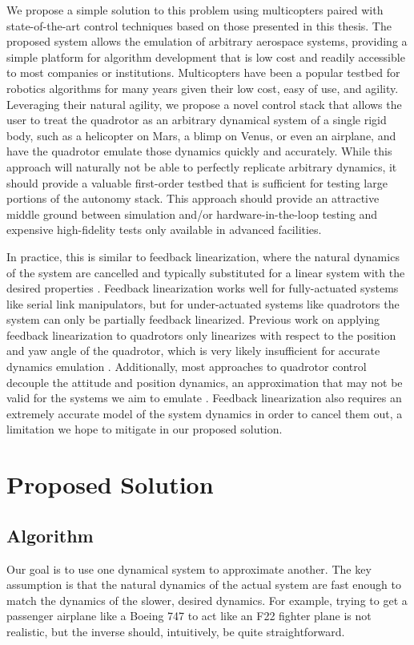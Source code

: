 \documentclass[../root.tex]{subfiles}
\begin{document}
We propose a simple solution to this problem using multicopters paired with
state-of-the-art control techniques based on those presented in this thesis.
The proposed system allows the emulation of arbitrary aerospace systems,
providing a simple platform for algorithm development that is low cost and
readily accessible to most companies or institutions. Multicopters have been
a popular testbed for robotics algorithms for many years given their low
cost, easy of use, and agility. Leveraging their natural agility, we propose
a novel control stack that allows the user to treat the quadrotor as an
arbitrary dynamical system of a single rigid body, such as a helicopter on
Mars, a blimp on Venus, or even an airplane, and have the quadrotor emulate
those dynamics quickly and accurately. While this approach will naturally not
be able to perfectly replicate arbitrary dynamics, it should provide a
valuable first-order testbed that is sufficient for testing large portions of
the autonomy stack. This approach should provide an attractive middle ground
between simulation and/or hardware-in-the-loop testing and expensive
high-fidelity tests only available in advanced facilities.

In practice, this is similar to feedback linearization, where the natural
dynamics of the system are cancelled and typically substituted for a linear
system with the desired properties
\cite{astrom_Feedback_2008,spong_Robot_2006}. Feedback linearization works
well for fully-actuated systems like serial link manipulators, but for
under-actuated systems like quadrotors the system can only be partially
feedback linearized. Previous work on applying feedback linearization to
quadrotors only linearizes with respect to the position and yaw angle of the
quadrotor, which is very likely insufficient for accurate dynamics emulation
\cite{lee_Feedback_2009}. Additionally, most approaches to quadrotor control
decouple the attitude and position dynamics, an approximation that may not be
valid for the systems we aim to emulate \cite{voos_Nonlinear_2009}. Feedback
linearization also requires an extremely accurate model of the system
dynamics in order to cancel them out, a limitation we hope to
mitigate in our proposed solution.

\section{Proposed Solution}

\subsection{Algorithm}
Our goal is to use one dynamical system to approximate another. The 
key assumption is that the natural dynamics of the actual system are
fast enough to match the dynamics of the slower, desired dynamics. 
For example, trying to get a passenger airplane like a Boeing 747 to 
act like an F22 fighter plane is not realistic, but the inverse should, 
intuitively, be quite straightforward. 
\end{document}
